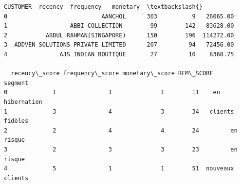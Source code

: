 \documentclass[11pt]{article}
\makeatletter
\newcommand{\boxspacing}{\kern\kvtcb@left@rule\kern\kvtcb@boxsep}
\newcommand{\prompt}[4]{
        {\ttfamily\llap{{\color{#2}[#3]:\hspace{3pt}#4}}\vspace{-\baselineskip}}
    }
\makeatother
\begin{document}
            \begin{tcolorbox}[breakable, size=fbox, boxrule=.5pt, pad at break*=1mm, opacityfill=0]
\prompt{Out}{outcolor}{37}{\boxspacing}
\begin{Verbatim}[commandchars=\\\{\}]
                           CUSTOMER  recency  frequency   monetary  \textbackslash{}
0                           AANCHOL      303          9   26065.00
1                  ABBI COLLECTION        99        142   83628.00
2           ABDUL RAHMAN(SINGAPORE)      150        196  114272.00
3  ADDVEN SOLUTIONS PRIVATE LIMITED      207         94   72456.00
4               AJS INDIAN BOUTIQUE       27         10    8368.75

  recency\_score frequency\_score monetary\_score RFM\_SCORE           segment
0             1               1              1        11    en hibernation
1             3               4              3        34   clients fidèles
2             2               4              4        24         en risque
3             2               3              3        23         en risque
4             5               1              1        51  nouveaux clients
\end{Verbatim}
\end{tcolorbox}
        
\end{document}

